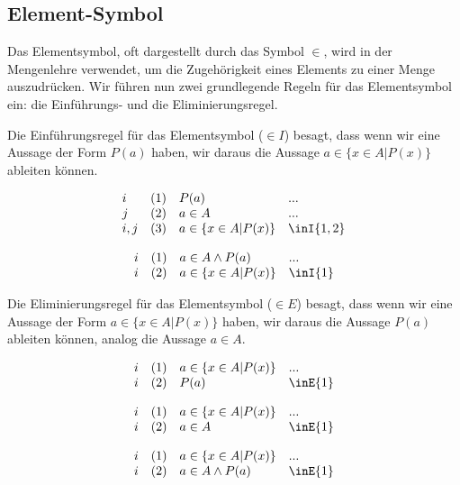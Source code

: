 \documentclass{book}
\theoremstyle{plain}
\theoremstyle{remark}
\theoremstyle{definition}
\begin{document}
\subsection{Element-Symbol}
\label{rule:inE} \label{rule:inI}
Das Elementsymbol, oft dargestellt durch das Symbol \(\in\), wird in der Mengenlehre verwendet, um die Zugehörigkeit eines Elements zu einer Menge auszudrücken. Wir führen nun zwei grundlegende Regeln für das Elementsymbol ein: die Einführungs- und die Eliminierungsregel.

Die Einführungsregel für das Elementsymbol (\(\in I\)) besagt, dass wenn wir eine Aussage der Form \(P(a)\) haben, wir daraus die Aussage \(a \in \{x\in A | P(x)\}\) ableiten können.

\[
\begin{array}{llll}
	i & (1) & P(a) & ... \\
	j & (2) & a \in A & ... \\
	i,j & (3) & a \in \{x \in A| P(x)\} & \inI{1,2} \\
\end{array}
\]

\[
\begin{array}{llll}
	i & (1) & a\in A\wedge P(a) & ... \\
	i & (2) & a \in \{x \in A| P(x)\} & \inI{1} \\
\end{array}
\]

Die Eliminierungsregel für das Elementsymbol (\(\in E\)) besagt, dass wenn wir eine Aussage der Form \(a \in \{x\in A | P(x)\}\) haben, wir daraus die Aussage \(P(a)\) ableiten können, analog die Aussage \( a\in A \).

\[
\begin{array}{llll}
	i & (1) & a \in \{x\in A | P(x)\} & ... \\
	i & (2) & P(a) & \inE{1} \\
\end{array}
\]

\[
\begin{array}{llll}
	i & (1) & a \in \{x\in A | P(x)\} & ... \\
	i & (2) & a\in A & \inE{1} \\
\end{array}
\]

\[
\begin{array}{llll}
	i & (1) & a \in \{x\in A | P(x)\} & ... \\
	i & (2) & a\in A\wedge P(a) & \inE{1} \\
\end{array}
\]
\end{document}

